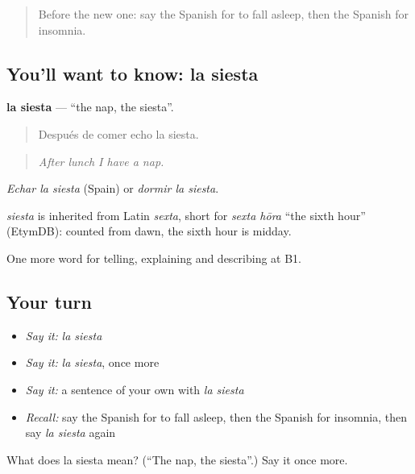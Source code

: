 \label{lesson:ES-C741-siesta}



\begin{quote}
Before the new one: say the Spanish for to fall asleep, then the Spanish for insomnia.
\end{quote}

\subsection*{You'll want to know: la siesta}
\textbf{la siesta} — \textquotedblleft{}the nap, the siesta\textquotedblright{}.

\begin{quote}
Después de comer echo la siesta.
\end{quote}

\begin{quote}
\emph{After lunch I have a nap.}
\end{quote}

\emph{Echar la siesta} (Spain) or \emph{dormir la siesta}.

\begin{cousinweb}
\emph{siesta} is inherited from Latin \emph{sexta}, short for \emph{sexta hōra} \textquotedblleft{}the sixth hour\textquotedblright{} (EtymDB): counted from dawn, the sixth hour is midday.
\end{cousinweb}

\begin{grammarlens}[title={What you've built}]
One more word for telling, explaining and describing at B1.
\end{grammarlens}

\subsection*{Your turn}
\begin{itemize}
\raggedright
  \item \emph{Say it:} \emph{la siesta}
  \item \emph{Say it:} \emph{la siesta}, once more
  \item \emph{Say it:} a sentence of your own with \emph{la siesta}
  \item \emph{Recall:} say the Spanish for to fall asleep, then the Spanish for insomnia, then say \emph{la siesta} again
\end{itemize}

\begin{tcolorbox}[breakable,colback=teal!4,colframe=teal!35!black,title={Before you move on}]
What does la siesta mean? (\textquotedblleft{}The nap, the siesta\textquotedblright{}.) Say it once more.
\end{tcolorbox}
